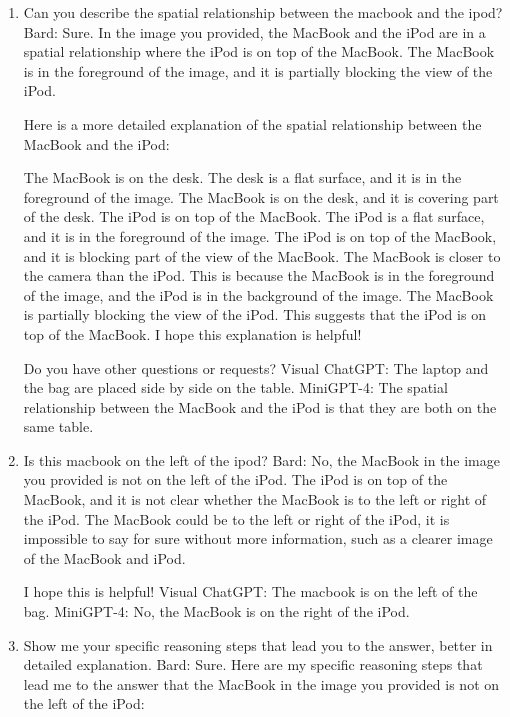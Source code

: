 \begin{enumerate}
    \item Can you describe the spatial relationship between the macbook and the ipod?
    \subitem Bard: 
    Sure. In the image you provided, the MacBook and the iPod are in a spatial relationship where the iPod is on top of the MacBook. The MacBook is in the foreground of the image, and it is partially blocking the view of the iPod.
    
    Here is a more detailed explanation of the spatial relationship between the MacBook and the iPod:
    
    The MacBook is on the desk. The desk is a flat surface, and it is in the foreground of the image. The MacBook is on the desk, and it is covering part of the desk.
    The iPod is on top of the MacBook. The iPod is a flat surface, and it is in the foreground of the image. The iPod is on top of the MacBook, and it is blocking part of the view of the MacBook.
    The MacBook is closer to the camera than the iPod. This is because the MacBook is in the foreground of the image, and the iPod is in the background of the image.
    The MacBook is partially blocking the view of the iPod. This suggests that the iPod is on top of the MacBook.
    I hope this explanation is helpful!
    
    Do you have other questions or requests?
    \subitem Visual ChatGPT: The laptop and the bag are placed side by side on the table.
    \subitem MiniGPT-4: The spatial relationship between the MacBook and the iPod is that they are both on the same table.
    \item Is this macbook on the left of the ipod?
    \subitem Bard: 
    No, the MacBook in the image you provided is not on the left of the iPod. The iPod is on top of the MacBook, and it is not clear whether the MacBook is to the left or right of the iPod. The MacBook could be to the left or right of the iPod, it is impossible to say for sure without more information, such as a clearer image of the MacBook and iPod.

    I hope this is helpful!
    \subitem Visual ChatGPT: The macbook is on the left of the bag.
    \subitem MiniGPT-4: No, the MacBook is on the right of the iPod.
    \item Show me your specific reasoning steps that lead you to the answer, better in detailed explanation.
    \subitem Bard: 
    Sure. Here are my specific reasoning steps that lead me to the answer that the MacBook in the image you provided is not on the left of the iPod:
    

\end{enumerate}
